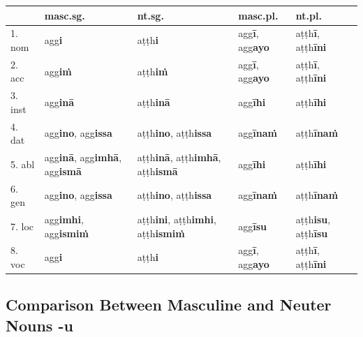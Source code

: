 \documentclass[11pt,oneside]{memoir}
\begin{document}
\begin{center}
\begin{tabular}{lllll}
 & \textbf{masc.sg.} & \textbf{nt.sg.} & \textbf{masc.pl.} & \textbf{nt.pl.}\\
\hline
1. nom & agg\textbf{i} & aṭṭh\textbf{i} & agg\textbf{ī}, agg\textbf{ayo} & aṭṭh\textbf{ī}, aṭṭh\textbf{īni}\\
2. acc & agg\textbf{iṁ} & aṭṭh\textbf{iṁ} & agg\textbf{ī}, agg\textbf{ayo} & aṭṭh\textbf{ī}, aṭṭh\textbf{īni}\\
3. inst & agg\textbf{inā} & aṭṭh\textbf{inā} & agg\textbf{īhi} & aṭṭh\textbf{īhi}\\
4. dat & agg\textbf{ino}, agg\textbf{issa} & aṭṭh\textbf{ino}, aṭṭh\textbf{issa} & agg\textbf{īnaṁ} & aṭṭh\textbf{īnaṁ}\\
5. abl & agg\textbf{inā}, agg\textbf{imhā}, agg\textbf{ismā} & aṭṭh\textbf{inā}, aṭṭh\textbf{imhā}, aṭṭh\textbf{ismā} & agg\textbf{īhi} & aṭṭh\textbf{īhi}\\
6. gen & agg\textbf{ino}, agg\textbf{issa} & aṭṭh\textbf{ino}, aṭṭh\textbf{issa} & agg\textbf{īnaṁ} & aṭṭh\textbf{īnaṁ}\\
7. loc & agg\textbf{imhi}, agg\textbf{ismiṁ} & aṭṭh\textbf{ini}, aṭṭh\textbf{imhi}, aṭṭh\textbf{ismiṁ} & agg\textbf{īsu} & aṭṭh\textbf{isu}, aṭṭh\textbf{īsu}\\
8. voc & agg\textbf{i} & aṭṭh\textbf{i} & agg\textbf{ī}, agg\textbf{ayo} & aṭṭh\textbf{ī}, aṭṭh\textbf{īni}\\
\end{tabular}
\end{center}
\subsection{Comparison Between Masculine and Neuter Nouns -u}
\label{sec:org314ffba}
\end{document}
